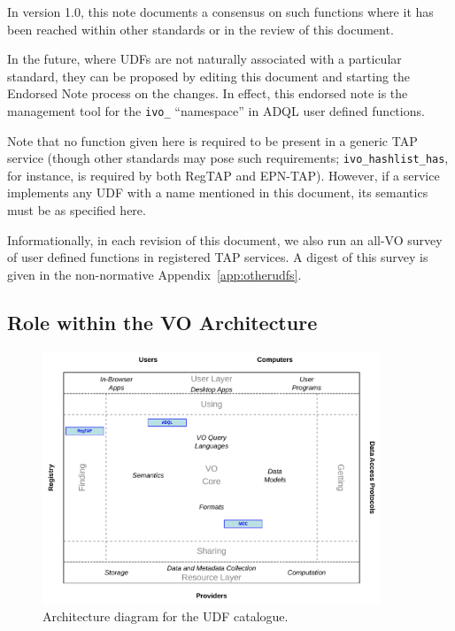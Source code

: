 \documentclass[11pt,a4paper]{ivoa}
\begin{document}
In version 1.0, this note documents a consensus 
on such functions where it has been
reached within other standards or in the review of this document.  

In the future, where UDFs are not naturally associated with a
particular standard, they can be proposed by editing this document and
starting the Endorsed Note process \citep{2017ivoa.spec.0517G} on the
changes.  In effect, this endorsed note is the management tool for
the \verb|ivo_| ``namespace'' in ADQL user defined functions.

Note that no function given here is required to be present in a generic
TAP service (though other standards may pose such requirements;
\verb|ivo_hashlist_has|, for instance, is required by both
RegTAP and EPN-TAP).  However, if a service implements any UDF with a
name mentioned in this document, its semantics must be as specified here.

Informationally, in each revision of this document, we also run an
all-VO survey of user defined functions in registered TAP services.  A
digest of this survey is given in the non-normative
Appendix~\ref{app:otherudfs}.

\subsection{Role within the VO Architecture}

\begin{figure}
\centering

\includegraphics[width=0.9\textwidth]{role_diagram.pdf}
\caption{Architecture diagram for the UDF catalogue.}
\label{fig:archdiag}
\end{figure}
\end{document}
